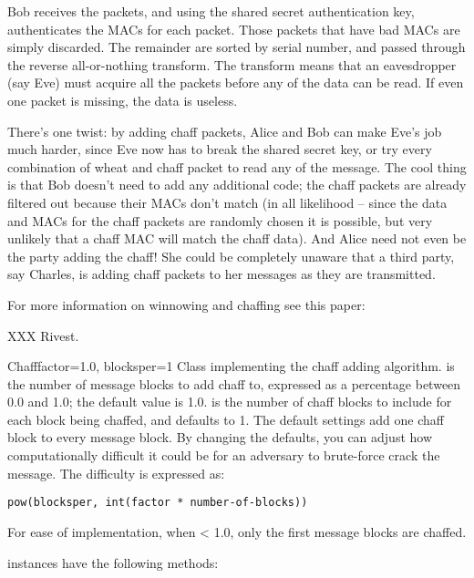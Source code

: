 \documentclass{howto}
\begin{document}
Bob receives the packets, and using the shared secret authentication key,
authenticates the MACs for each packet.  Those packets that have bad MACs are
simply discarded.  The remainder are sorted by serial number, and passed
through the reverse all-or-nothing transform.  The transform means that an
eavesdropper (say Eve) must acquire all the packets before any of the data can
be read.  If even one packet is missing, the data is useless.

There's one twist: by adding chaff packets, Alice and Bob can make Eve's job
much harder, since Eve now has to break the shared secret key, or try every
combination of wheat and chaff packet to read any of the message.  The cool
thing is that Bob doesn't need to add any additional code; the chaff packets
are already filtered out because their MACs don't match (in all likelihood --
since the data and MACs for the chaff packets are randomly chosen it is
possible, but very unlikely that a chaff MAC will match the chaff data).  And
Alice need not even be the party adding the chaff!  She could be completely
unaware that a third party, say Charles, is adding chaff packets to her
messages as they are transmitted.

For more information on winnowing and chaffing see this paper:

XXX Rivest.

\begin{classdesc}{Chaff}{factor=1.0, blocksper=1}
Class implementing the chaff adding algorithm. 
 is the number of message blocks 
            to add chaff to, expressed as a percentage between 0.0 and 1.0; the default value is 1.0.
 is the number of chaff blocks to include for each block
            being chaffed, and defaults to 1.  The default settings 
add one chaff block to every
            message block.  By changing the defaults, you can adjust how
            computationally difficult it could be for an adversary to
            brute-force crack the message.  The difficulty is expressed as:

\begin{verbatim}
pow(blocksper, int(factor * number-of-blocks))
\end{verbatim}

For ease of implementation, when  < 1.0, only the first
 message blocks are chaffed.
\end{classdesc}

 instances have the following methods:
\end{document}
